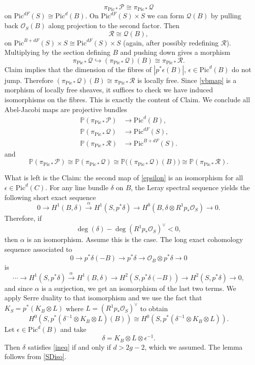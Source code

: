 \documentclass{amsart}
\theoremstyle{definition}
\newcommand{\PP} {\mathbb{P}}
\renewcommand{\O}{\mathcal{O}}
\newcommand{\Pic}{\mathrm{Pic}}
\newcommand{\rt}[1]{\stackrel{#1\,}{\rightarrow}}
\newcommand{\cP}{\mathcal{P}}
\newcommand{\cQ}{\mathcal{Q}}
\newcommand{\cR}{\mathcal{R}}
\begin{document}
$$
\pi_{\Pic *} \cP \cong \pi_{\Pic *} \cQ
$$
on $\Pic^{dF}(S) \cong \Pic^{d}(B)$. On $\Pic^{dF}(S) \times S$ we can form $\cQ(B)$ by pulling back $\O_S(B)$ along projection to the second factor. Then
$$
\cR \cong \cQ(B),
$$
on $\Pic^{B+dF}(S) \times S \cong \Pic^{dF}(S) \times S$ (again, after possibly redefining $\cR$). Multiplying by the section defining $B$ and pushing down gives a morphism
\begin{equation} \label{vbmap}
\pi_{\Pic *} \cQ \hookrightarrow (\pi_{\Pic *} \cQ)(B) \cong \pi_{\Pic *} \cR.
\end{equation}
Claim implies that the dimension of the fibres of $|p^* \epsilon(B)|$, $\epsilon \in \Pic^d(B)$ do not jump. Therefore $(\pi_{\Pic *} \cQ)(B) \cong \pi_{\Pic *} \cR$ is locally free. Since \eqref{vbmap} is a morphism of locally free sheaves, it suffices to check we have induced isomorphisms on the fibres. This is exactly the content of Claim. We conclude all Abel-Jacobi maps are projective bundles 
\begin{align*}
\PP(\pi_{\Pic *} \mathcal{P}) &\rightarrow \Pic^d(B), \\
\PP(\pi_{\Pic *} \mathcal{Q}) &\rightarrow \Pic^{dF}(S), \\
\PP(\pi_{\Pic *} \mathcal{R}) &\rightarrow \Pic^{B+dF}(S).
\end{align*}
and 
$$
\PP(\pi_{\Pic *} \mathcal{P}) \cong \PP(\pi_{\Pic *} \mathcal{Q}) \cong \PP\big((\pi_{\Pic *} \mathcal{Q})(B)\big) \cong \PP(\pi_{\Pic *} \mathcal{R}).
$$

What is left is the Claim: the second map of \eqref{epsilon} is an isomorphism for all $\epsilon \in \Pic^d(C)$. For any line bundle $\delta$ on $B$, the Leray spectral sequence yields the following short exact sequence
\[
0\to H^{1} (B,\delta ) \stackrel{\alpha}{\longrightarrow} H^{1} (S,p^{*}\delta ) \longrightarrow H^{0} (B,\delta \otimes R^{1}p _{*}\O_S ) \to 0.
\]
Therefore, if
\begin{equation} \label{ineq}
\deg( \delta) - \deg (R^1 p_* \O_S)^\vee < 0,
\end{equation}
then $\alpha$ is an isomorphism. Assume this is the case. The long exact cohomology sequence associated to 
\[
0\to p^{*}\delta (-B)\to p^{*}\delta \to \O _{B}\otimes p^{*}\delta \to 0
\]
is
\[
\dotsb \to H^{1} (S,p ^{*} \delta )\rt{\alpha }H^{1} (B,\delta )\to H^{2} (S,p ^{*}\delta (-B))\to H^{2} (S,p ^{*}\delta )\to 0,
\]
and since $\alpha $ is a surjection, we get an isomorphism of the last
two terms. We apply Serre duality to that isomorphism and we use the
fact that $K_{S} = p ^{*} (K_{B}\otimes L)$ where $L = \left(R^1 p
_{*}\O _{S} \right)^{\vee }$ \cite[Thm.~12.1]{BPV} to obtain
\begin{equation} \label{SDiso}
H^{0} (S,p ^{*} (\delta ^{-1}\otimes K_{B}\otimes L) (B)) \cong H^{0}(S,p ^{*} (\delta ^{-1}\otimes K_{B}\otimes L)).
\end{equation}
Let $\epsilon \in \Pic^d(B)$ and take
$$
\delta =K_{B}\otimes L\otimes \epsilon ^{-1}.
$$
Then $\delta$ satisfies \eqref{ineq} if and only if $d>2g-2$, which we assumed. The lemma follows from \eqref{SDiso}.
\end{document}
